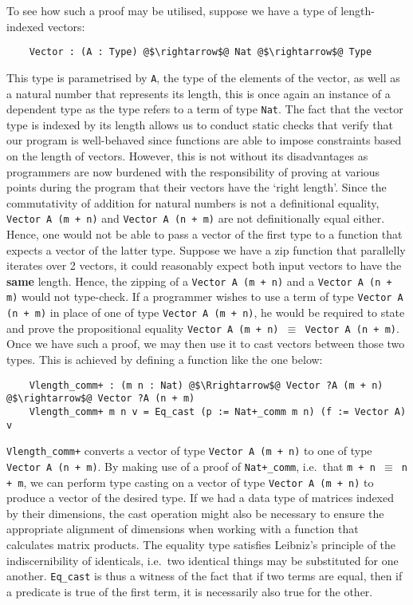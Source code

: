 \documentclass[12pt,twoside,maitrise]{dms}
\theoremstyle{definition}
\numberwithin{equation}{section}
\numberwithin{table}{chapter}
\numberwithin{figure}{chapter}
\newcommand\id[1] {\texttt{#1}}
\newcommand\fn[1] {\texttt{#1}}
\begin{document}
To see how such a proof may be utilised, suppose we have a type of
length-indexed vectors:

\begin{verbatim}
    Vector : (A : Type) @$\rightarrow$@ Nat @$\rightarrow$@ Type
\end{verbatim}

This type is parametrised by \fn{A}, the type of the elements of the vector, as
well as a natural number that represents its length, this is once again an
instance of a dependent type as the type refers to a term of type \fn{Nat}. The
fact that the vector type is indexed by its length allows us to conduct static
checks that verify that our program is well-behaved since functions are able to
impose constraints based on the length of vectors. However, this is not without
its disadvantages as programmers are now burdened with the responsibility of
proving at various points during the program that their vectors have the `right
length'. Since the commutativity of addition for natural numbers is not a
definitional equality, \fn{Vector A (m + n)} and \fn{Vector A (n + m)} are not
definitionally equal either. Hence, one would not be able to pass a vector of
the first type to a function that expects a vector of the latter type. Suppose
we have a zip function that parallelly iterates over 2 vectors, it could
reasonably expect both input vectors to have the \textbf{same} length. Hence,
the zipping of a \fn{Vector A (m + n)} and a \fn{Vector A (n + m)} would not
type-check. If a programmer wishes to use a term of type \fn{Vector A (n + m)}
in place of one of type \fn{Vector A (m + n)}, he would be required to state
and prove the propositional equality \fn{Vector A (m + n) $\equiv$ Vector A (n
+ m)}. Once we have such a proof, we may then use it to cast vectors between
those two types. This is achieved by defining a function like the one below:

\begin{verbatim}
    Vlength_comm+ : (m n : Nat) @$\Rrightarrow$@ Vector ?A (m + n) @$\rightarrow$@ Vector ?A (n + m)
    Vlength_comm+ m n v = Eq_cast (p := Nat+_comm m n) (f := Vector A) v
\end{verbatim}

\fn{Vlength\_comm+} converts a vector of type \fn{Vector A (m + n)} to one of
type \fn{Vector A (n + m)}. By making use of a proof of \id{Nat+\_comm}, i.e.\
that \fn{m + n $\equiv$ n + m}, we can perform type casting on a vector of type
\fn{Vector A (m + n)} to produce a vector of the desired type. If we had a data
type of matrices indexed by their dimensions, the cast operation might also be
necessary to ensure the appropriate alignment of dimensions when working with a
function that calculates matrix products. The equality type satisfies Leibniz's
principle of the indiscernibility of identicals, i.e.\ two identical things may
be substituted for one another. \fn{Eq\_cast} is thus a witness of the fact
that if two terms are equal, then if a predicate is true of the first term, it
is necessarily also true for the other.
\end{document}
